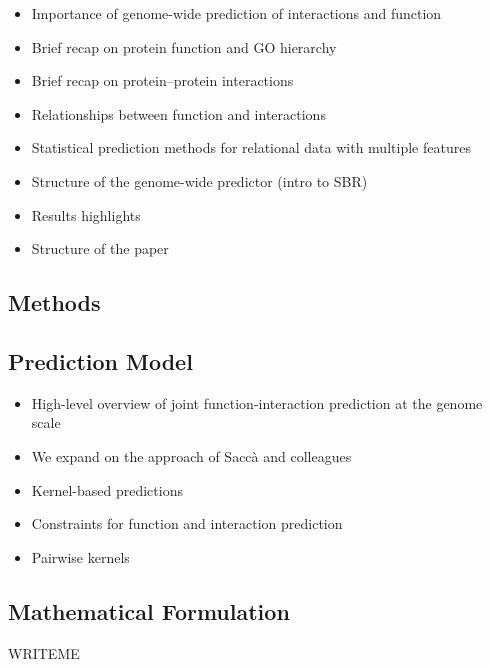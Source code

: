 \documentclass{bioinfo}
\begin{document}
\begin{itemize}

    \item Importance of genome-wide prediction of interactions and function

    \item Brief recap on protein function and GO hierarchy

    \item Brief recap on protein--protein interactions

    \item Relationships between function and interactions

    \item Statistical prediction methods for relational data with multiple
    features

    \item Structure of the genome-wide predictor (intro to SBR)

    \item Results highlights

    \item Structure of the paper

\end{itemize}



\begin{methods}

\section{Methods}

\subsection{Prediction Model}

\begin{itemize}

    \item High-level overview of joint function-interaction prediction at
    the genome scale

    \item We expand on the approach of Sacc\`a and colleagues~\cite{sacca2014ppisbr}

    \item Kernel-based predictions

    \item Constraints for function and interaction prediction

    \item Pairwise kernels

\end{itemize}

\subsection{Mathematical Formulation}

WRITEME

\end{methods}
\end{document}
